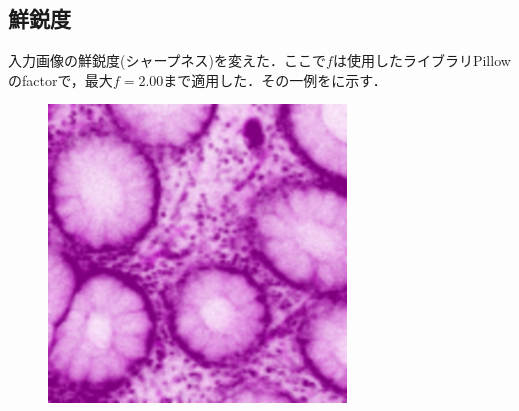 \subsection*{鮮鋭度}
入力画像の鮮鋭度(シャープネス)を変えた．ここで$f$は使用したライブラリPillowのfactorで，最大$f=2.00$まで適用した．その一例をに示す．

\begin{figure}[H]
	\centering
	
	\begin{minipage}{0.24\columnwidth}
		\centering
		\includegraphics[clip, width=\linewidth]{fig/preprocessing/data_aug/color/SHARPNESS/SHARPNESS_0_00}
	\end{minipage}
	\begin{minipage}{0.24\columnwidth}
		\centering

\end{minipage}
\end{figure}
